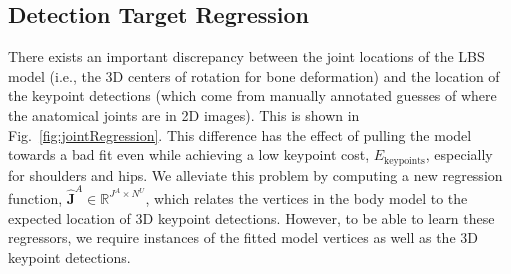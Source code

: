 %	
%



\subsection{Detection Target Regression}
There exists an important discrepancy between the joint locations of the LBS model (i.e., the 3D centers of rotation for bone deformation) and the location of the keypoint detections (which come from manually annotated guesses of where the anatomical joints are in 2D images). This is shown in Fig.~\ref{fig:jointRegression}. This difference has the effect of pulling the model towards a bad fit even while achieving a low keypoint cost, $E_{\textrm{keypoints}}$, especially for shoulders and hips. We alleviate this problem by computing a new regression function, $\mathbf{\hat{J}}^A \in \mathds{R}^{J^A\times N^U}$, which relates the vertices in the body model to the expected location of 3D keypoint detections. However, to be able to learn these regressors, we require instances of the fitted model vertices as well as the 3D keypoint detections.


